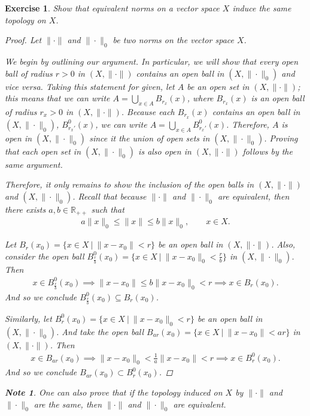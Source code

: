 \documentclass[11pt]{article}
\theoremstyle{mystyle}
\newtheorem{note}{Note}[section]
\newtheorem{protoexer}{Exercise}[section]
\newenvironment{exer}
{\colorlet{shadecolor}{blue!15}\begin{shaded}\begin{protoexer}}
{\end{protoexer}\end{shaded}}
\newcommand{\0}{\mathbf{0}}
\begin{document}
\begin{exer}\label{equivalentnormstopology}
Show that equivalent norms on a vector space $X$ induce the same topology on $X$.
\begin{proof}
Let $\|\cdot\|$ and $\|\cdot\|_0$ be two norms on the vector space $X$. 

We begin by outlining our argument. In particular, we will show that every open ball of radius $r > 0$ in $(X, \|\cdot\|)$ contains an open ball in $(X, \|\cdot\|_0)$ and vice versa. Taking this statement for given, let $A$ be an open set in $(X, \|\cdot\|)$; this means that we can write $A = \bigcup_{x \in A} B_{r_x}(x)$, where $B_{r_x}(x)$ is an open ball of radius $r_x > 0$ in $(X, \|\cdot\|)$. Because each $B_{r_x}(x)$ contains an open ball in $(X, \|\cdot\|_0)$, $B_{r_x'}^0(x)$, we can write $A = \bigcup_{x \in A} B_{r_x'}^0(x)$. Therefore, $A$ is open in $(X, \|\cdot\|_0)$ since it the union of open sets in $(X, \|\cdot\|_0)$. Proving that each open set in $(X, \|\cdot\|_0)$ is also open in $(X, \|\cdot\|)$ follows by the same argument.

Therefore, it only remains to show the inclusion of the open balls in $(X, \|\cdot\|)$ and $(X, \|\cdot\|_0)$.
Recall that because  $\|\cdot\|$ and $\|\cdot\|_0$ are equivalent, then there exists $a, b \in \mathbb{R}_{++}$ such that
\begin{align*}
    a\|x\|_0 \leq \|x\| \leq b \|x\|_0, \qquad x \in X.
\end{align*}

Let $B_r(x_0) = \{x \in X \ | \ \|x - x_0\| < r\}$ be an open ball in $(X, \|\cdot\|)$. Also, consider the open ball $B_{\frac{r}{b}}^0(x_0) = \{x \in X \ | \ \|x - x_0\|_0 < \frac{r}{b} \}$ in $(X, \|\cdot\|_0)$. Then
\begin{align*}
    x \in B_{\frac{r}{b}}^0(x_0) \implies \|x - x_0\| \leq b\|x - x_0\|_0 < r \implies x \in B_r(x_0).
\end{align*}
And so we conclude $B_{\frac{r}{b}}^0(x_0) \subseteq B_r(x_0)$.

Similarly, let $B_r^0(x_0) = \{x \in X \ | \ \|x - x_0\|_0 < r\}$ be an open ball in $(X, \|\cdot\|_0)$. And take the open ball $B_{ar}(x_0) = \{x \in X \ | \ \|x - x_0\| < ar\}$ in $(X, \|\cdot\|)$. Then
\begin{align*}
    x \in B_{ar}(x_0) \implies \|x - x_0\|_0 <\frac{1}{a}\|x - x_0\| < r \implies x \in B_r^0(x_0).
\end{align*}
And so we conclude $B_{ar}(x_0) \subset B_r^0(x_0)$.
\end{proof}

\begin{note}
One can also prove that if the topology induced on $X$ by $\|\cdot\|$ and $\|\cdot\|_0$ are the same, then $\|\cdot\|$ and $\|\cdot\|_0$ are equivalent.
\end{note}
\end{exer}
\end{document}
